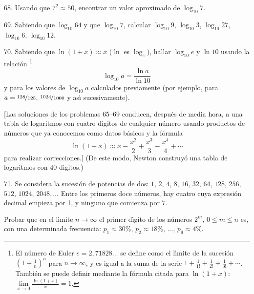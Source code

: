 \begin{problem}{68.}
	Usando que $7^2 \approx 50$, encontrar un valor aproximado de $\log_{10} 7$.
\end{problem}

\begin{sloppypar}
\begin{problem}{69.}
	Sabiendo que $\log_{10} 64$ y que $\log_{10} 7$, calcular $\log_{10} 9$, $\log_{10} 3$, $\log_{10} 27$, $\log_{10} 6$, $\log_{10} 12$.
\end{problem}
\end{sloppypar}

\begin{problem}{70.}
	Sabiendo que $\ln (1+x) \approx x$ ($\ln$ es $\log_e$), hallar $\log_{10} e$ y
	$\ln 10$ usando la relaci\'on \footnote{El n\'umero de Euler $e = 2{,}71828\dots$ se define como el l\'{\i}mite de la sucesi\'on
	$\left(1+\frac1n\right)^n$ para $n\to \infty$, y es igual a la suma de la serie  
	$1+\frac 1{1!} +\frac 1{2!}+\frac 1{3!}+\dotsb$. Tambi\'en se puede definir mediante la f\'ormula citada para
	$\ln (1+x)$: $\lim\limits_{x\to 0}\frac{\ln(1+x)}{x} = 1$.}
	\begin{equation*}
		\log_{10} a=\frac{\ln a}{\ln 10}
	\end{equation*} 
	y para los valores de $\log_{10} a$ calculados previamente (por ejemplo, para $a=\nicefrac{128}{125}$, $\nicefrac{1024}{1000}$ y as\'{\i} sucesivamente).

	[Las soluciones de los problemas 65--69 conducen, despu\'es de media hora, a una tabla de logaritmos con cuatro d\'{\i}gitos de cualquier n\'umero usando productos de n\'umeros que ya conocemos como datos b\'asicos y la f\'ormula
	\begin{equation*}
		\ln (1+x) \approx x-\frac{x^2}{2}+\frac{x^3}{3}-\frac{x^4}{4}+\dotsb
	\end{equation*}
	para realizar correcciones.] (De este modo, Newton construy\'o una tabla de logaritmos con 40 d\'{\i}gitos.)
\end{problem}

\begin{problem}{71.}
	Se considera la sucesi\'on de potencias de dos: $1$, $2$, $4$, $8$, $16$, $32$, $64$,
	$128$, $256$, $512$, $1024$, $2048, \dotsc$ Entre los primeros doce n\'umeros, hay cuatro cuya expresi\'on decimal empieza por 1, y ninguno que comienza por 7.

	
	Probar que en el l\'{\i}mite $n \to \infty$ el primer d\'{\i}gito de los n\'umeros $2^m$,
	$0\leqslant m \leqslant n$ es, con una determinada frecuencia:
	$p_1 \approx 30\%$, $p_2 \approx 18\%$,  $\dotsc$, $p_9 \approx 4\%$.
\end{problem}

